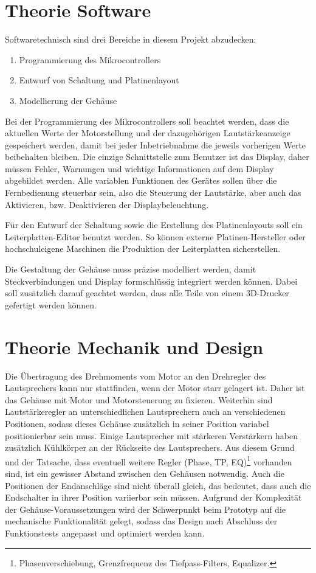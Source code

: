 \documentclass[11pt, titlepage]{report}
\begin{document}
		\section{Theorie Software}
		\label{sec:Theorie Software}
			Softwaretechnisch sind drei Bereiche in diesem Projekt abzudecken:
			\begin{enumerate}
				\item Programmierung des Mikrocontrollers
				\item Entwurf von Schaltung und Platinenlayout
				\item Modellierung der Gehäuse
			\end{enumerate} 

			Bei der Programmierung des Mikrocontrollers soll beachtet werden, dass die aktuellen Werte der Motorstellung und der dazugehörigen Lautstärkeanzeige gespeichert werden, damit bei jeder Inbetriebnahme die jeweils vorherigen Werte beibehalten bleiben. Die einzige Schnittstelle zum Benutzer ist das Display, daher müssen Fehler, Warnungen und wichtige Informationen auf dem Display abgebildet werden. Alle variablen Funktionen des Gerätes sollen über die Fernbedienung steuerbar sein, also die Steuerung der Lautstärke, aber auch das Aktivieren, bzw. Deaktivieren der Displaybeleuchtung.

			Für den Entwurf der Schaltung sowie die Erstellung des Platinenlayouts soll ein Leiterplatten-Editor benutzt werden. So können externe Platinen-Hersteller oder hochschuleigene Maschinen die Produktion der Leiterplatten sicherstellen.

			Die Gestaltung der Gehäuse muss präzise modelliert werden, damit Steckverbindungen und Display formschlüssig integriert werden können. Dabei soll zusätzlich darauf geachtet werden, dass alle Teile von einem 3D-Drucker gefertigt werden können.


		\section{Theorie Mechanik und Design}
		\label{sec:Design}
			Die Übertragung des Drehmoments vom Motor an den Drehregler des Lautsprechers kann nur stattfinden, wenn der Motor starr gelagert ist. Daher ist das Gehäuse mit Motor und Motorsteuerung zu fixieren. Weiterhin sind Lautstärkeregler an unterschiedlichen Lautsprechern auch an verschiedenen Positionen, sodass dieses Gehäuse zusätzlich in seiner Position variabel positionierbar sein muss. 
			\newline Einige Lautsprecher mit stärkeren Verstärkern haben zusätzlich Kühlkörper an der Rückseite des Lautsprechers. Aus diesem Grund und der Tatsache, dass eventuell weitere Regler (Phase, TP, EQ)\footnote{Phasenverschiebung, Grenzfrequenz des Tiefpass-Filters, Equalizer.} vorhanden sind, ist ein gewisser Abstand zwischen den Gehäusen notwendig. Auch die Positionen der Endanschläge sind nicht überall gleich, das bedeutet, dass auch die Endschalter in ihrer Position variierbar sein müssen.
			\newline Aufgrund der Komplexität der Gehäuse-Voraussetzungen wird der Schwerpunkt beim Prototyp auf die mechanische Funktionalität gelegt, sodass das Design nach Abschluss der Funktionstests angepasst und optimiert werden kann.
		\label{sec:Theorie Mechanik}
\end{document}
